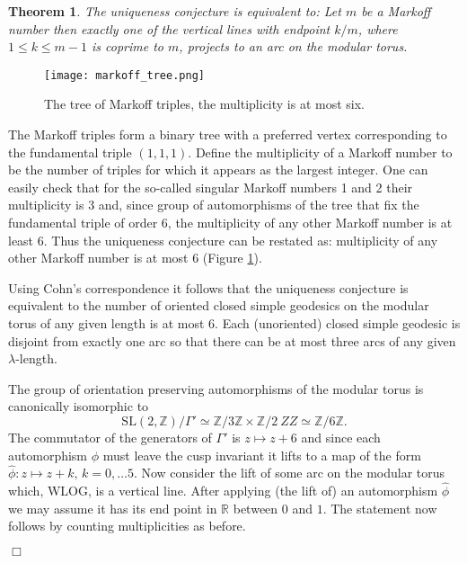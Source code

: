 \documentclass[12pt,a4paper]{amsart}
\newtheorem{thm}{Theorem}[section]
\def\ZZ{\mathbb{Z}}
\def\RR{\mathbb{R}}
\def\sl2{\mathrm{SL}(2, \ZZ)}
\begin{document}
 \begin{thm}
The uniqueness conjecture is equivalent to: \newline
Let $m$ be a Markoff number then exactly one of the vertical lines
with endpoint  $k/m$, where $1\leq k \leq m-1$ is coprime to $m$,
projects to an arc on the modular torus.
\end{thm}


\begin{figure}[ht]
\begin{center}
\texttt{[image: markoff\_tree.png]} 
\end{center}
\caption{The tree of Markoff triples, the multiplicity is at most six.}
	\label{fig:markoff_tree}
\end{figure}

\proof The Markoff triples form a binary tree with a preferred vertex
corresponding to the fundamental triple $(1,1,1)$. Define the multiplicity of a
Markoff number to be the  number of triples for which it appears as the largest
integer. One can easily check that for the so-called singular Markoff numbers 1
and 2 their multiplicity is 3 and, since group of automorphisms of the tree
that fix the fundamental triple of order 6, the multiplicity of any other
Markoff number is at least $6$. Thus the uniqueness conjecture can be restated as:
multiplicity of any other Markoff number is at most $6$ (Figure \ref{fig:markoff_tree}).

Using Cohn's correspondence it follows that the uniqueness conjecture is equivalent
to the number of oriented closed simple geodesics on the modular torus of any
given length is at most 6. Each (unoriented) closed simple geodesic is disjoint
from exactly one arc so that there can be at most three arcs of any given
$\lambda$-length.

The group of orientation preserving  automorphisms of the modular torus 
is canonically isomorphic to 
$$\sl2 / \Gamma' \simeq \ZZ/3\ZZ \times \ZZ/2\ ZZ \simeq \ZZ/6\ZZ .$$
The commutator of the generators of $ \Gamma'$  is $z \mapsto z + 6$
and since each automorphism $\phi$ must leave the cusp invariant it lifts to
a map of the form $\hat{\phi} : z \mapsto z + k,\, k= 0,\dots 5$.
Now consider the lift of some arc on the modular torus 
which, WLOG, is a vertical line. 
After applying (the lift of)  an automorphism $\hat{\phi}$ 
we may assume it has its end point in $\RR$ between $0$ and $1$.
The statement now follows by counting multiplicities as before.

\hfill $\Box$
\end{document}
